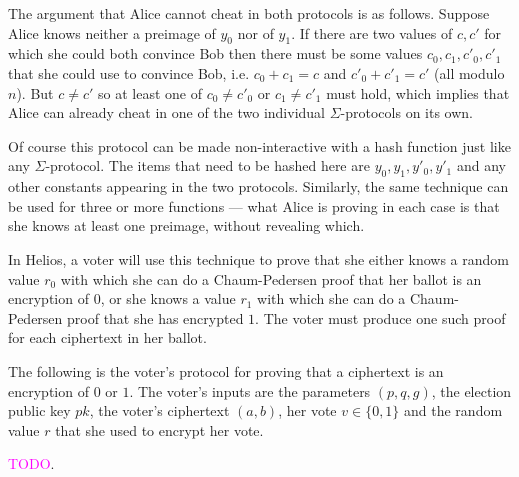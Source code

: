 \documentclass{llncs}
\begin{document}
The argument that Alice cannot cheat in both protocols is as follows. Suppose
Alice knows neither a preimage of $y_0$ nor of $y_1$. If there are two values
of $c, c'$ for which she could both convince Bob then there must be some values
$c_0, c_1, c'_0, c'_1$ that she could use to convince Bob, i.e. $c_0 + c_1 = c$
and $c'_0 + c'_1 = c'$ (all modulo $n$). But $c \neq c'$ so at least one of
$c_0 \neq c'_0$ or $c_1 \neq c'_1$ must hold, which implies that Alice can
already cheat in one of the two individual $\Sigma$-protocols on its own.

Of course this protocol can be made non-interactive with a hash function just
like any $\Sigma$-protocol. The items that need to be hashed here are $y_0, y_1,
y'_0, y'_1$ and any other constants appearing in the two protocols. Similarly,
the same technique can be used for three or more functions --- what Alice is
proving in each case is that she knows at least one preimage, without revealing
which.

In Helios, a voter will use this technique to prove that she either knows a
random value $r_0$ with which she can do a Chaum-Pedersen proof that her ballot
is an encryption of $0$, or she knows a value $r_1$ with which she can do a
Chaum-Pedersen proof that she has encrypted $1$. The voter must produce one such
proof for each ciphertext in her ballot.

\begin{definition}
The following is the voter's protocol for proving that a ciphertext is an
encryption of $0$ or $1$. The voter's inputs are the parameters $(p, q, g)$,
the election public key $pk$, the voter's ciphertext $(a, b)$, her vote $v \in
\{0, 1\}$ and the random value $r$ that she used to encrypt her vote.
\end{definition}

\textcolor{Fuchsia}{TODO}.
\end{document}
